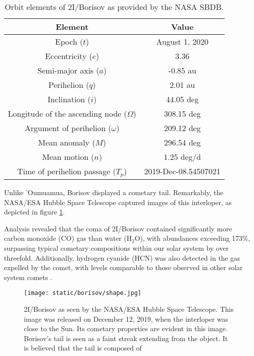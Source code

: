 \begin{table}[H]
  \centering
  \begin{tabular}{|c|c|}
    \hline
    Element                                    & Value                \\
    \hline
    Epoch ($t$)                                & August 1, 2020       \\
    Eccentricity ($e$)                         & 3.36                 \\
    Semi-major axis ($a$)                      & -0.85 au             \\
    Perihelion ($q$)                           & 2.01 au              \\
    Inclination ($i$)                          & 44.05 deg            \\
    Longitude of the ascending node ($\Omega$) & 308.15 deg           \\
    Argument of perihelion ($\omega$)          & 209.12 deg           \\
    Mean anomaly ($M$)                         & 296.54 deg           \\
    Mean motion ($n$)                          & 1.25 deg/d           \\
    Time of perihelion passage ($T_p$)         & 2019-Dec-08.54507021 \\
    \hline
  \end{tabular}
  \caption{Orbit elements of 2I/Borisov as provided by the NASA SBDB.}
  \label{tab:borisov_elements}
\end{table}

Unlike 'Oumuamua, Borisov displayed a cometary tail. Remarkably, the NASA/ESA
Hubble Space Telescope captured images of this interloper, as depicted in figure
\ref{fig:borisov_shape}.

Analysis revealed that the coma of 2I/Borisov contained significantly more
carbon monoxide (CO) gas than water (H$_2$O), with abundances exceeding 173\%,
surpassing typical cometary compositions within our solar system by over
threefold. Additionally, hydrogen cyanide (HCN) was also detected in the gas
expelled by the comet, with levels comparable to those observed in other solar
system comets \cite{bodewits2020}.

\begin{figure}[H]
  \centering
  \texttt{[image: static/borisov/shape.jpg]}
  \caption[Borisov as seen by the NASA/ESA Hubble Space Telescope]{
    2I/Borisov as seen by the NASA/ESA Hubble Space Telescope. This image was
    released on December 12, 2019, when the interloper was close to the Sun. Its
    cometary properties are evident in this image. Borisov's tail is seen as a
    faint streak extending from the object. It is believed that the tail is composed
    of
  }
  \label{fig:borisov_shape}
\end{figure}

